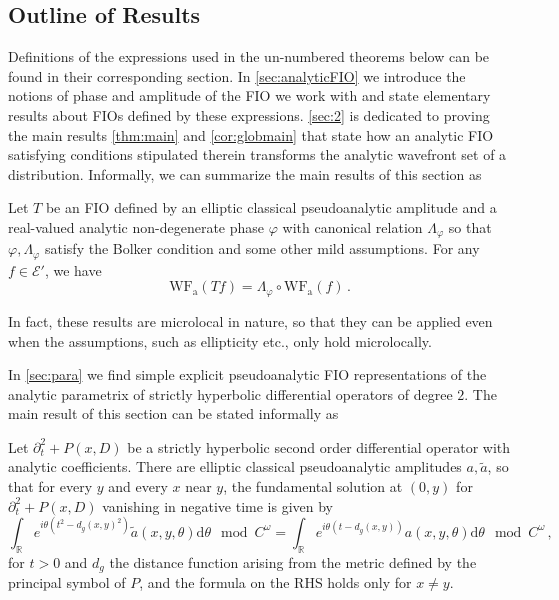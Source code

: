\documentclass[
	fontsize=11pt, 
	twoside=false, 
	abstract=true, 
	a4paper,
]{scrartcl}
\newcommand{\RR}{\mathbb{R}}
\newcommand{\dd}{\mathrm{d}}
\newcommand{\del}{\partial}
\newcommand{\td}[1]{\tilde{#1}}
\newcommand{\wf}{\mathrm{WF}_{\mathrm{a}}}
\begin{document}
\subsection{Outline of Results}

Definitions of the expressions used in the un-numbered theorems below can be found in their corresponding section. 
In \cref{sec:analyticFIO} we introduce the notions of phase and amplitude of the FIO we work with and state elementary results about FIOs defined by these expressions. \cref{sec:2} is dedicated to proving the main results \cref{thm:main} and \cref{cor:globmain} that state how an analytic FIO satisfying conditions stipulated therein transforms the analytic wavefront set of a distribution. Informally, we can summarize the main results of this section as 
\begin{theorem*}
	Let $T$ be an FIO defined by an elliptic classical pseudoanalytic amplitude and a real-valued analytic non-degenerate phase $\varphi$ with canonical relation $\Lambda_\varphi$ so that $\varphi, \Lambda_\varphi$ satisfy the Bolker condition and some other mild assumptions. For any $f\in\mathcal{E}'$, we have 
	\[
		\wf(Tf) = \Lambda_\varphi\circ \wf(f)\,.
	\]
\end{theorem*}
In fact, these results are microlocal in nature, so that they can be applied even when the assumptions, such as ellipticity etc., only hold microlocally.

In \cref{sec:para} we find simple explicit pseudoanalytic FIO representations of the analytic parametrix of strictly hyperbolic differential operators of degree $2$. The main result of this section can be stated informally as
\begin{theorem*}
	Let $\del_t^2+P(x,D)$ be a strictly hyperbolic second order differential operator with analytic coefficients. There are elliptic classical pseudoanalytic amplitudes $a, \td{a}$, so that for every $y$ and every $x$ near $y$, the fundamental solution at $(0,y)$ for $\del_t^2+P(x,D)$ vanishing in negative time is given by
	\[
		\int_\RR e^{i\theta(t^2-d_g(x,y)^2)}\td{a}(x,y,\theta)\dd \theta \mod C^\omega = \int_\RR e^{i\theta(t-d_g(x,y))}a(x,y,\theta)\dd \theta \mod C^\omega\,,
	\]
	for $t>0$ and $d_g$ the distance function arising from the metric defined by the principal symbol of $P$, and the formula on the RHS holds only for $x\neq y$.
\end{theorem*}
\end{document}
